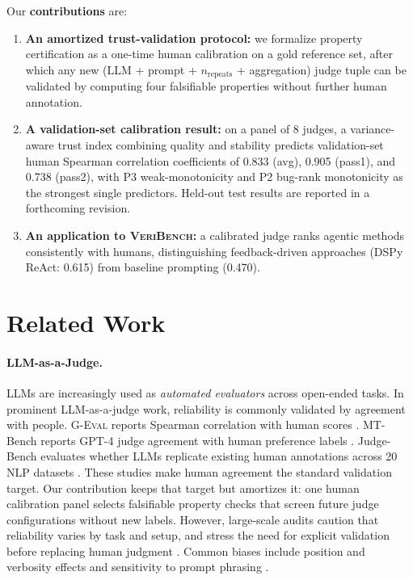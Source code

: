\documentclass{article}
\begin{document}
Our \textbf{contributions} are:
\begin{enumerate}
  \item \textbf{An amortized trust-validation protocol:} we formalize property certification as a one-time human calibration on a gold reference set, after which any new (LLM + prompt + \(n_\text{repeats}\) + aggregation) judge tuple can be validated by computing four falsifiable properties without further human annotation.
  \item \textbf{A validation-set calibration result:} on a panel of 8 judges, a variance-aware trust index combining quality and stability predicts validation-set human Spearman correlation coefficients of 0.833 (avg), 0.905 (pass1), and 0.738 (pass2), with P3 weak-monotonicity and P2 bug-rank monotonicity as the strongest single predictors. Held-out test results are reported in a forthcoming revision.
  \item \textbf{An application to \textsc{VeriBench}:} a calibrated judge ranks agentic methods consistently with humans, distinguishing feedback-driven approaches (DSPy ReAct: 0.615) from baseline prompting (0.470).
\end{enumerate}

\section{Related Work}
\paragraph{LLM-as-a-Judge.}
LLMs are increasingly used as \emph{automated evaluators} across open-ended tasks.
In prominent LLM-as-a-judge work, reliability is commonly validated by agreement with people.
\textsc{G-Eval} reports Spearman correlation with human scores \citep{Liu2023GEval}.
MT-Bench reports GPT-4 judge agreement with human preference labels \citep{Zheng2023MTBench}.
Judge-Bench evaluates whether LLMs replicate existing human annotations across 20 NLP datasets \citep{Kocmi2024HumanVsLLM}.
These studies make human agreement the standard validation target.
Our contribution keeps that target but amortizes it: one human calibration panel selects falsifiable property checks that screen future judge configurations without new labels.
However, large-scale audits caution that reliability varies by task and setup, and stress the need for explicit validation before replacing human judgment \citep{Kocmi2024HumanVsLLM,Li2024TrustLLMJudgments}.
Common biases include position and verbosity effects and sensitivity to prompt phrasing \citep{Zheng2023MTBench,Li2024TrustLLMJudgments}.
\end{document}
